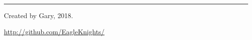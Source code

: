 \documentclass[10pt,letterpaper]{article}
\begin{document}
\begin{multicols}{3}



\rule{0.3\linewidth}{0.25pt}
\scriptsize

Created by Gary, 2018.

\href{http://github.com/EagleKnights/}{http://github.com/EagleKnights/}


\end{multicols}
\end{document}

